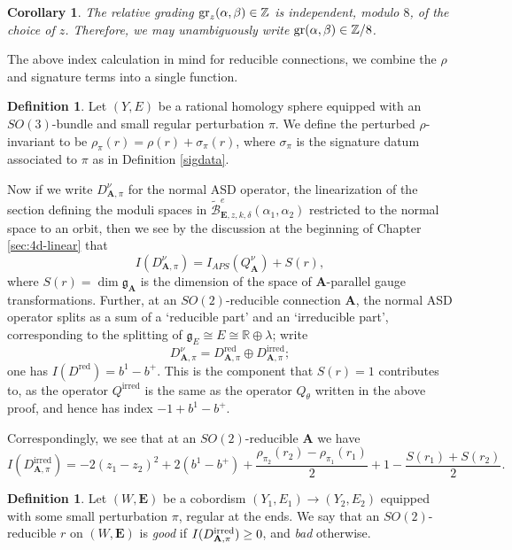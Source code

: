 \documentclass{memo-l}
\newtheorem{corollary}[theorem]{Corollary}
\theoremstyle{definition}
\newtheorem{definition}[theorem]{Definition}
\theoremstyle{remark}
\numberwithin{section}{chapter}
\numberwithin{equation}{chapter}
\begin{document}
\begin{corollary}\label{gr-mod-8}The relative grading $\textup{gr}_z(\alpha, \beta) \in \mathbb Z$ is independent, modulo $8$, of the choice of $z$. Therefore, we may unambiguously write $\textup{gr}(\alpha, \beta) \in \mathbb Z/8$.
\end{corollary}

The above index calculation in mind for reducible connections, we combine the $\rho$ and signature terms into a single function.

\begin{definition}Let $(Y,E)$ be a rational homology sphere equipped with an $SO(3)$-bundle and small regular perturbation $\pi$. We define the perturbed $\rho$-invariant to be $\rho_\pi(r) = \rho(r) + \sigma_\pi(r)$, where $\sigma_\pi$ is the signature datum associated to $\pi$ as in Definition \ref{sigdata}.
\end{definition}

Now if we write $D^\nu_{\mathbf{A},\pi}$ for the normal ASD operator, the linearization of the section defining the moduli spaces in $\widetilde{\mathcal B}^{e}_{\mathbf{E},z,k,\delta}(\alpha_1, \alpha_2)$ restricted to the normal space to an orbit, then we see by the discussion at the beginning of Chapter \ref{sec:4d-linear} that 
$$I(D^\nu_{\mathbf{A},\pi}) = I_{APS}(Q_{\mathbf{A}}^\nu) + S(r),$$ 
where $S(r) = \dim \mathfrak{g}_{\mathbf{A}}$ is the dimension of the space of $\mathbf{A}$-parallel gauge transformations. Further, at an $SO(2)$-reducible connection $\mathbf{A}$, the normal ASD operator splits as a sum of a `reducible part' and an `irreducible part', corresponding to the splitting of $\mathfrak g_E \cong E \cong \mathbb R \oplus \lambda$; write 
$$D^\nu_{\mathbf{A},\pi} = D_{\mathbf{A},\pi}^{\text{red}} \oplus D^{\text{irred}}_{\mathbf{A},\pi};$$ 
one has $I(D^\text{red}) = b^1 - b^+$. This is the component that $S(r) = 1$ contributes to, as the operator $Q^{\text{irred}}$ is the same as the operator $Q_\theta$ written in the above proof, and hence has index $-1+b^1 - b^+$. 

Correspondingly, we see that at an $SO(2)$-reducible $\mathbf{A}$ we have $$I(D^{\text{irred}}_{\mathbf{A},\pi}) = -2(z_1 - z_2)^2 +2(b^1-b^+) + \frac{\rho_{\pi_2}(r_2) - \rho_{\pi_1}(r_1)}{2} + 1 - \frac{S(r_1) + S(r_2)}{2}.$$ 

\begin{definition}\label{badred}Let $(W,\mathbf{E})$ be a cobordism $(Y_1, E_1) \to (Y_2, E_2)$ equipped with some small perturbation $\pi$, regular at the ends. We say that an $SO(2)$-reducible $r$ on $(W,\mathbf{E})$ is \emph{good} if $I(D^{\textup{irred}}_{\mathbf{A},\pi}) \geq 0$, and \emph{bad} otherwise.
\end{definition}
\end{document}
